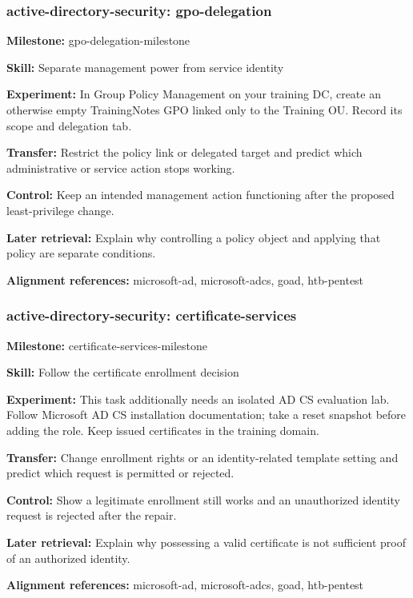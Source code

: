 \subsubsection{active-directory-security: gpo-delegation}
\noindent\textbf{Milestone:} gpo-delegation-milestone\par
\noindent\textbf{Skill:} Separate management power from service identity\par
\noindent\textbf{Experiment:} In Group Policy Management on your training DC, create an otherwise empty TrainingNotes GPO linked only to the Training OU. Record its scope and delegation tab.\par
\noindent\textbf{Transfer:} Restrict the policy link or delegated target and predict which administrative or service action stops working.\par
\noindent\textbf{Control:} Keep an intended management action functioning after the proposed least-privilege change.\par
\noindent\textbf{Later retrieval:} Explain why controlling a policy object and applying that policy are separate conditions.\par
\noindent\textbf{Alignment references:} microsoft-ad, microsoft-adcs, goad, htb-pentest\par
\subsubsection{active-directory-security: certificate-services}
\noindent\textbf{Milestone:} certificate-services-milestone\par
\noindent\textbf{Skill:} Follow the certificate enrollment decision\par
\noindent\textbf{Experiment:} This task additionally needs an isolated AD CS evaluation lab. Follow Microsoft AD CS installation documentation; take a reset snapshot before adding the role. Keep issued certificates in the training domain.\par
\noindent\textbf{Transfer:} Change enrollment rights or an identity-related template setting and predict which request is permitted or rejected.\par
\noindent\textbf{Control:} Show a legitimate enrollment still works and an unauthorized identity request is rejected after the repair.\par
\noindent\textbf{Later retrieval:} Explain why possessing a valid certificate is not sufficient proof of an authorized identity.\par
\noindent\textbf{Alignment references:} microsoft-ad, microsoft-adcs, goad, htb-pentest\par
